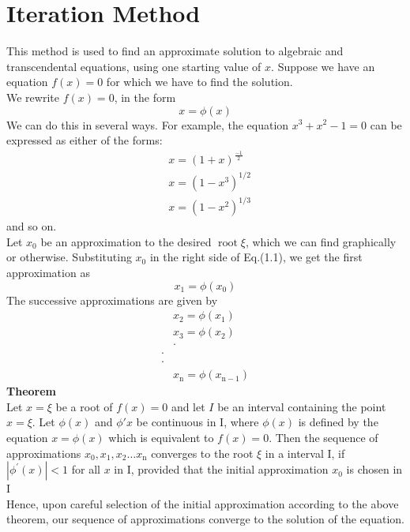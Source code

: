 \documentclass[12pt,a4paper,oneside]{book}
\begin{document}
\section{Iteration Method}
This method is used to find an approximate solution to algebraic and transcendental equations, using one starting value of $x$. Suppose we have an equation $f(x)=0$ for which we have to find the solution.\\
We rewrite $f(x)=0$, in the form \begin{equation}
	x=\phi(x)
\end{equation} We can do this in several ways. For example, the equation $x^3+x^2-1=0$ can be expressed as either of the forms: $$ \begin{aligned} & x=(1+x)^{\frac{-1}{2}} \\ & x=\left(1-x^3\right)^{1 / 2} \\ & x=\left(1-x^2\right)^{1 / 3} \end{aligned} $$ and so on.\\
Let $x_0$ be an approximation to the desired $\operatorname{root} \xi$, which we can find graphically or otherwise. Substituting $x_0$ in the right side of Eq.(1.1),  we get the first approximation as $$ x_1=\phi\left(x_0\right) $$ The successive approximations are given by $$ \begin{aligned} & x_2=\phi\left(x_1\right) \\ & x_3=\phi\left(x_2\right)\\&\cdot 
	\\ \cdot 
	\\ \cdot \\ & x_{\mathrm{n}}=\phi\left(x_{\mathrm{n}-1}\right) \end{aligned} $$ 
\textbf{Theorem}\\ Let $x=\xi$ be a root of $f(x)=0$ and let $I$ be an interval containing the point $x=\xi$. Let $\phi(x)$ and $\phi 'x$ be continuous in I, where $\phi(x)$ is defined by the equation $x=\phi(x)$ which is equivalent to $f(x)=0$. Then the sequence of approximations $x_0, x_1, x_2 \ldots x_{\mathrm{n}}$ converges to the root $\xi$ in a interval I, if $\left|\phi^{\prime}(x)\right|<1$ for all $x$ in I, provided that the initial approximation $x_0$ is chosen in I\\ [0.3cm]
Hence, upon careful selection of the initial approximation according to the above theorem, our sequence of approximations converge to the solution of the equation.
\end{document}
